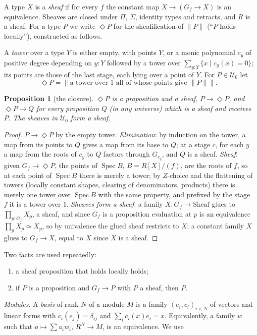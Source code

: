 \documentclass[11pt]{amsart}
\newtheorem{proposition}[theorem]{Proposition}
\theoremstyle{definition}
\theoremstyle{remark}
\newcommand{\Spec}{\operatorname{Spec}}
\newcommand{\close}{\Diamond}
\newcommand{\tr}[1]{\|#1\|}
\newcommand{\U}{\mathcal U}
\begin{document}
A type $X$ is a \emph{sheaf} if for every $f$ the constant
map $X\to(G_f\to X)$ is an equivalence. Sheaves are closed under $\Pi$,
$\Sigma$, identity types and retracts, and $R$ is a sheaf. For a type $P$ we
write $\close P$ for the sheafification of $\tr P$ (``$P$ holds
locally''), constructed as follows.

A \emph{tower} over a type $Y$ is either empty, with points $Y$, or a
monic polynomial $c_y$ of positive degree depending on $y:Y$ followed by a
tower over $\sum_{y:Y}\{x\mid c_y(x)=0\}$; its points are those of the last
stage, each lying over a point of $Y$. For $P\in\U_0$ let
\[\close P=\tr{\text{a tower over }1\text{ all of whose points give }\tr P}.\]

\begin{proposition}[the closure]\label{p:close}
$\close P$ is a proposition and a sheaf, $P\to\close P$, and $\close P\to Q$
for every proposition $Q$ (in any universe) which is a sheaf and receives
$P$. The sheaves in $\U_0$ form a sheaf.
\end{proposition}
\begin{proof}
$P\to\close P$ by the empty tower. \emph{Elimination}: by induction on the
tower, a map from its points to $Q$ gives a map from its base to $Q$; at a
stage $c$, for each $y$ a map from the roots of $c_y$ to $Q$ factors through
$G_{c_y}$, and $Q$ is a sheaf. \emph{Sheaf}: given $G_f\to\close P$, the
points of $\Spec B$, $B=R[X]/(f)$, are the roots of $f$, so at each point of
$\Spec B$ there is merely a tower; by $Z$-choice and the flattening of
towers (locally constant shapes, clearing of denominators, products) there
is merely one tower over $\Spec B$ with the same property, and prefixed by
the stage $f$ it is a tower over $1$. \emph{Sheaves form a sheaf}: a family
$X:G_f\to\mathrm{Sheaf}$ glues to $\prod_{p:G_f}X_p$, a sheaf, and since
$G_f$ is a proposition evaluation at $p$ is an equivalence
$\prod_{p}X_p\simeq X_p$, so by univalence the glued sheaf restricts to $X$;
a constant family $X$ glues to $G_f\to X$, equal to $X$ since $X$ is a
sheaf.
\end{proof}

Two facts are used repeatedly:
\begin{enumerate}
\item a sheaf proposition that holds locally holds;
\item if $P$ is a proposition and $G_f\to P$ with $P$ a sheaf, then $P$.
\end{enumerate}

\emph{Modules.} A \emph{basis} of rank $N$ of a module $M$ is a family
$(e_i,c_i)_{i<N}$ of vectors and linear forms with $c_i(e_j)=\delta_{ij}$
and $\sum_i c_i(x)e_i=x$. Equivalently, a family $w$ such that
$a\mapsto\sum a_iw_i$, $R^N\to M$, is an equivalence. We use
\end{document}
